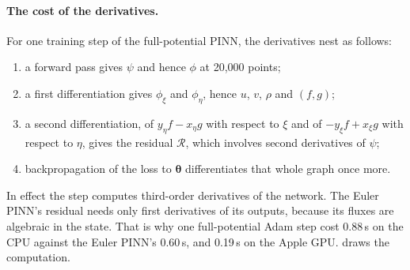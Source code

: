 \paragraph{The cost of the derivatives.}
For one training step of the full-potential PINN, the derivatives nest as follows:
\begin{enumerate}
  \item a forward pass gives $\psi$ and hence $\phi$ at 20,000 points;
  \item a first differentiation gives $\phi_\xi$ and $\phi_\eta$, hence $u$, $v$, $\rho$ and
    $(f,g)$;
  \item a second differentiation, of $y_\eta f - x_\eta g$ with respect to $\xi$ and of
    $-y_\xi f + x_\xi g$ with respect to $\eta$, gives the residual $\mathcal R$, which involves
    second derivatives of $\psi$;
  \item backpropagation of the loss to $\bm\theta$ differentiates that whole graph once more.
\end{enumerate}
In effect the step computes third-order derivatives of the network. The Euler PINN's residual
needs only first derivatives of its outputs, because its fluxes are algebraic in the state. That is
why one full-potential Adam step cost 0.88\,s on the CPU against the Euler PINN's 0.60\,s, and
0.19\,s on the Apple GPU.  draws the computation.

